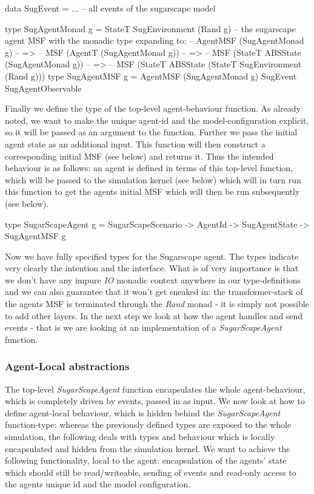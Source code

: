 \begin{HaskellCode}
data SugEvent = ... -- all events of the sugarscape model

type SugAgentMonad g = StateT SugEnvironment (Rand g)
-- the sugarscape agent MSF with the monadic type expanding to:
-- AgentMSF (SugAgentMonad g)
-- => 
-- MSF (AgentT (SugAgentMonad g))
-- => 
-- MSF (StateT ABSState (SugAgentMonad g))
-- =>
-- MSF (StateT ABSState (StateT SugEnvironment (Rand g)))
type SugAgentMSF g = AgentMSF (SugAgentMonad g) SugEvent SugAgentObservable
\end{HaskellCode}

Finally we define the type of the top-level agent-behaviour function. As already noted, we want to make the unique agent-id and the model-configuration explicit, so it will be passed as an argument to the function. Further we pass the initial agent state as an additional input. This function will then construct a corresponding initial MSF (see below) and returns it. Thus the intended behaviour is as follows: an agent is defined in terms of this top-level function, which will be passed to the simulation kernel (see below) which will in turn run this function to get the agents initial MSF which will then be run subsequently (see below).

\begin{HaskellCode}
type SugarScapeAgent g = SugarScapeScenario -> AgentId -> SugAgentState -> SugAgentMSF g
\end{HaskellCode}

Now we have fully specified types for the Sugarscape agent. The types indicate very clearly the intention and the interface. What is of very importance is that we don't have any impure \textit{IO} monadic context anywhere in our type-definitions and we can also guarantee that it won't get sneaked in: the transformer-stack of the agents MSF is terminated through the \textit{Rand} monad - it is simply not possible to add other layers. In the next step we look at how the agent handles and send events - that is we are looking at an implementation of a \textit{SugarScapeAgent} function.

\subsubsection{Agent-Local abstractions}
The top-level \textit{SugarScapeAgent} function encapsulates the whole agent-behaviour, which is completely driven by events, passed in as input. We now look at how to define agent-local behaviour, which is hidden behind the \textit{SugarScapeAgent} function-type: whereas the previously defined types are exposed to the whole simulation, the following deals with types and behaviour which is locally encapsulated and hidden from the simulation kernel. We want to achieve the following functionality, local to the agent: encapsulation of the agents' state which should still be read/writeable, sending of events and read-only access to the agents unique id and the model configuration.

